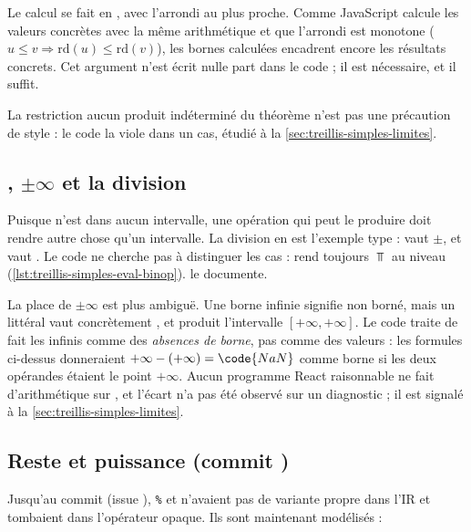 Le calcul se fait en , avec l'arrondi au plus proche. Comme
JavaScript calcule les valeurs concrètes avec la même arithmétique et que
l'arrondi est monotone ($u \le v \Rightarrow \mathrm{rd}(u) \le
\mathrm{rd}(v)$), les bornes calculées encadrent encore les résultats
concrets. Cet argument n'est écrit nulle part dans le code ; il est
nécessaire, et il suffit.

La restriction \og aucun produit indéterminé\fg{} du théorème n'est pas une
précaution de style : le code la viole dans un cas, étudié à la
\cref{sec:treillis-simples-limites}.

\subsection{, $\pm\infty$ et la division}

Puisque  n'est dans aucun intervalle, une opération qui peut le
produire doit rendre autre chose qu'un intervalle. La division en est
l'exemple type :  vaut $\pm$, et  vaut
. Le code ne cherche pas à distinguer les cas : 
rend toujours $\Top$ au niveau 
(\cref{lst:treillis-simples-eval-binop}).  le
documente.

La place de $\pm\infty$ est plus ambiguë. Une borne infinie signifie
\og non borné\fg{}, mais un littéral  vaut concrètement
, et  produit l'intervalle
$[+\infty, +\infty]$. Le code traite de fait les infinis comme des
\emph{absences de borne}, pas comme des valeurs : les formules ci-dessus
donneraient $+\infty - (+\infty) = \code{NaN}$ comme borne si les deux
opérandes étaient le point $+\infty$. Aucun programme React raisonnable ne
fait d'arithmétique sur , et l'écart n'a pas été observé sur
un diagnostic ; il est signalé à la \cref{sec:treillis-simples-limites}.

\subsection{Reste et puissance (commit )}

Jusqu'au commit  (issue ), \texttt{\%} et \code{**}
n'avaient pas de variante propre dans l'IR et tombaient dans l'opérateur
opaque. Ils sont maintenant modélisés :


